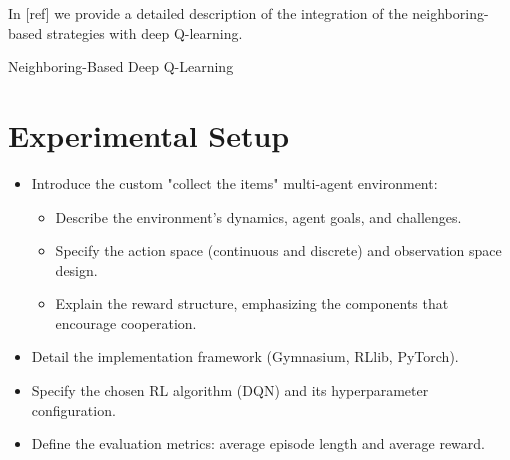 \documentclass[sigconf]{acmart}
\begin{document}
In [ref] we provide a detailed description of the integration of the neighboring-based strategies with deep Q-learning.
\begin{algorithm}
  \caption{Neighboring-Based Deep Q-Learning}
  \label{alg:neighbor_dqn}
\end{algorithm}

\section{Experimental Setup}\label{sec:experiments}
\begin{itemize}
\item Introduce the custom "collect the items" multi-agent environment:
\begin{itemize}
\item Describe the environment's dynamics, agent goals, and challenges.
\item Specify the action space (continuous and discrete) and observation space design.
\item Explain the reward structure, emphasizing the components that encourage cooperation.
\end{itemize}
\item Detail the implementation framework (Gymnasium, RLlib, PyTorch).
\item Specify the chosen RL algorithm (DQN) and its hyperparameter configuration.
\item Define the evaluation metrics: average episode length and average reward.
\end{itemize}
\end{document}
